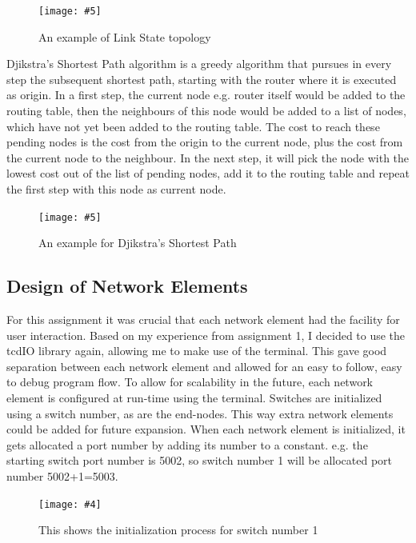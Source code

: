 \documentclass{article}
\newcommand{\includescalefigure}[5]{
\begin{figure}[htb]
\centering
\texttt{[image: \#5]}
\captionsetup{width=.8\linewidth} 
\caption[#2]{#3}
\label{#1}
\end{figure}
}
\newcommand{\includefigure}[4]{
\begin{figure}[htb]
\centering
\texttt{[image: \#4]}
\captionsetup{width=.8\linewidth} 
\caption[#2]{#3}
\label{#1}
\end{figure}
}
\begin{document}
\includescalefigure{LStopology}{Link State Topology}{An example of Link State topology}{0.5}{LStopology.png}

Djikstra's Shortest Path algorithm is a greedy algorithm that pursues in every step the subsequent shortest path, starting with the router where it is executed as origin. In a first step, the current node e.g. router itself would be added to the routing table, then the neighbours of this node would be added to a list of nodes, which have not yet been added to the routing table. The cost to reach these pending nodes is the cost from the origin to the current node, plus the cost from the current node to the neighbour. In the next step, it will pick the node with the lowest cost out of the list of pending nodes, add it to the routing table and repeat the first step with this node as current node.

\includescalefigure{LSDjikstra}{Example for Djikstra's Shortest Path}{An example  for Djikstra's Shortest Path}{0.5}{LSDjikstra.png}
\pagebreak

\subsection{Design of Network Elements}
For this assignment it was crucial that each network element had the facility for user interaction. Based on my experience from assignment 1, I decided to use the tcdIO library again, allowing me to make use of the terminal. This gave good separation between each network element and allowed for an easy to follow, easy to debug program flow. 
\newline
\newline
To allow for scalability in the future, each network element is configured at run-time using the terminal. Switches are initialized using a switch number, as are the end-nodes. This way extra network elements could be added for future expansion. When each network element is initialized, it gets allocated a port number by  adding its number to a constant. e.g. the starting switch port number is 5002, so switch number 1 will be allocated port number 5002+1=5003.

\includefigure{SwitchInterface}{Switch Terminal Interface}{This shows the initialization process for switch number 1}{Switch-Interface.PNG}
 
\end{document}
